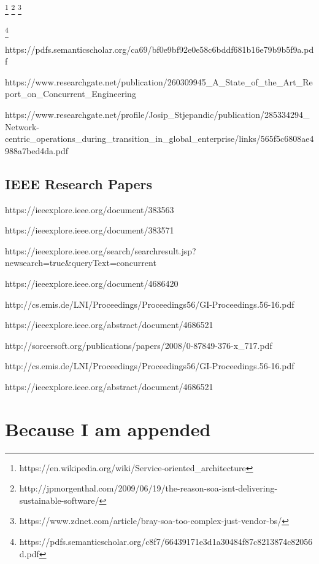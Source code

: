 \documentclass[
  a4paper, %
  11pt, %
  twoside,    %
  onecolumn,  %
  openright,  %
]{memoir}
\begin{document}
\footnote{https://en.wikipedia.org/wiki/Service-oriented\_architecture}
\footnote{http://jpmorgenthal.com/2009/06/19/the-reason-soa-isnt-delivering-sustainable-software/}
\footnote{https://www.zdnet.com/article/bray-soa-too-complex-just-vendor-bs/}

\footnote{https://pdfs.semanticscholar.org/c8f7/66439171e3d1a30484f87c8213874c82056d.pdf}

https://pdfs.semanticscholar.org/ca69/bf0e9bf92e0e58c6bddf681b16e79b9b5f9a.pdf

https://www.researchgate.net/publication/260309945_A_State_of_the_Art_Report_on_Concurrent_Engineering

https://www.researchgate.net/profile/Josip_Stjepandic/publication/285334294_Network-centric_operations_during_transition_in_global_enterprise/links/565f5c6808ae4988a7bed4da.pdf

\section{IEEE Research Papers} %
\label{sec:ieee_research_papers}

https://ieeexplore.ieee.org/document/383563

https://ieeexplore.ieee.org/document/383571

https://ieeexplore.ieee.org/search/searchresult.jsp?newsearch=true&queryText=concurrent%

https://ieeexplore.ieee.org/document/4686420

http://cs.emis.de/LNI/Proceedings/Proceedings56/GI-Proceedings.56-16.pdf

https://ieeexplore.ieee.org/abstract/document/4686521

http://sorcersoft.org/publications/papers/2008/0-87849-376-x_717.pdf

http://cs.emis.de/LNI/Proceedings/Proceedings56/GI-Proceedings.56-16.pdf

https://ieeexplore.ieee.org/abstract/document/4686521




\chapter{Because I am appended}



\backmatter


% 
% 
\end{document}

